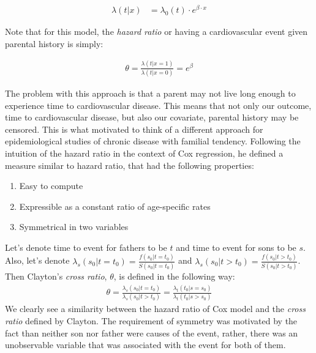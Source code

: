 \documentclass[]{article}
\begin{document}
$$
\begin{aligned}
	\lambda(t|x) &= \lambda_0(t) \cdot e^{\beta\cdot x}
\end{aligned}
$$

Note that for this model, the \emph{hazard ratio} or having a cardiovascular event given parental history is simply:

$$
\begin{aligned}
 \theta = \frac{\lambda(t|x=1)}{\lambda(t|x=0)} = e^{\beta}
 \end{aligned}
$$
 
The problem with this approach is that a parent may not live long enough to experience time to cardiovascular disease. This means that not only our outcome, time to cardiovascular disease, but also our covariate, parental history may be censored. This is what motivated \cite{clayton1978model} to think of a different approach for epidemiological studies of chronic disease with familial tendency. Following the intuition of the hazard ratio in the context of Cox regression, he defined a measure similar to hazard ratio, that had the following properties:
\begin{enumerate}
	\item Easy to compute
	\item Expressible as a constant ratio of age-specific rates
  \item Symmetrical in two variables
\end{enumerate}
Let's denote time to event for fathers to be $t$ and time to event for sons to be $s$. Also, let's denote $\lambda_s(s_0|t=t_0) = \frac{f(s_0|t=t_0)}{S(s_0|t=t_0)}$ and $\lambda_s(s_0|t>t_0) = \frac{f(s_0|t>t_0)}{S(s_0|t>t_0)}$. Then Clayton's \emph{cross ratio}, $\theta$, is defined in the following way:
$$
\begin{aligned}
	\theta = \frac{\lambda_s(s_0|t=t_0)}{\lambda_s(s_0|t>t_0)} = \frac{\lambda_t(t_0|s=s_0)}{\lambda_t(t_0|s>s_0)}
\end{aligned}
$$
We clearly see a similarity between the hazard ratio of Cox model and the \emph{cross ratio} defined by Clayton. The requirement of symmetry was motivated by the fact than neither son nor father were causes of the event, rather, there was an unobservable variable that was associated with the event for both of them.\\
\end{document}

